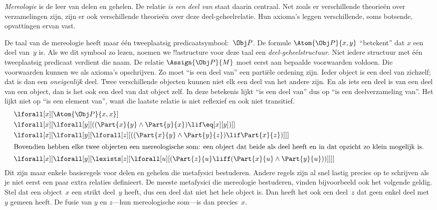 \documentclass[../../../include/open-logic-section]{subfiles}
\begin{document}
\begin{ex}
\emph{Mereologie} is de leer van delen en gehelen. De relatie
\emph{is een deel van} staat daarin centraal. Net zoals er
verschillende theorieën over verzamelingen zijn, zijn er ook
verschillende theorieën over deze deel-geheelrelatie. Hun axioma's
leggen verschillende, soms botsende, opvattingen ervan vast.

De taal van de mereologie heeft maar één tweeplaatsig
predicaatsymbool:~$\Obj P$. De formule $\Atom{\Obj P}{x, y}$
``betekent'' dat $x$ een deel van~$y$ is. Als we dit symbool zo lezen,
noemen we !!a{structure} voor deze taal een
\emph{deel-geheelstructuur}. Niet iedere structuur met één
tweeplaatsig predicaat verdient die naam. De relatie
$\Assign{\Obj P}{M}$ moet eerst aan bepaalde voorwaarden voldoen. Die
voorwaarden kunnen we als axioma's opschrijven. Zo moet ``is een deel
van'' een partiële ordening zijn. Ieder object is een deel van
zichzelf; dat is dan een \emph{oneigenlijk} deel. Twee verschillende
objecten kunnen niet elk een deel van het andere zijn. En als iets een
deel is van een deel van een object, dan is het ook een deel van dat
object zelf. In deze betekenis lijkt ``is een deel van'' dus op ``is
een deelverzameling van''. Het lijkt niet op ``is een element van'',
want die laatste relatie is niet reflexief en ook niet transitief.
\begin{align*}
& \lforall[x][\Atom{\Obj P}{x,x}] \\
& \lforall[x][\lforall[y][((\Part{x}{y} \land \Part{y}{x})
      \lif \eq[x][y])]] \\
& \lforall[x][\lforall[y][\lforall[z][((\Part{x}{y} \land
        \Part{y}{z}) \lif \Part{x}{z})]]]\\
\intertext{Bovendien hebben elke twee objecten een mereologische som: een object
  dat beide als deel heeft en in dat opzicht zo klein mogelijk is.}  &
\lforall[x][\lforall[y][\lexists[z][\lforall[u][(\Part{z}{u} \liff
        (\Part{x}{u} \land \Part{y}{u}))]]]]
\end{align*}
Dit zijn maar enkele basisregels voor delen en gehelen die metafysici
bestuderen. Andere regels zijn al snel lastig precies op te schrijven
als je niet eerst een paar extra relaties definieert. De meeste
metafysici die mereologie bestuderen, vinden bijvoorbeeld ook het
volgende geldig. Stel dat een object~$x$ een strikt deel~$y$ heeft,
dus een deel dat niet het hele object is. Dan heeft het ook een deel~$z$
dat geen enkel deel met~$y$ gemeen heeft. De fusie van $y$ en $z$---hun
mereologische som---is dan precies~$x$.
\end{ex}
\end{document}
